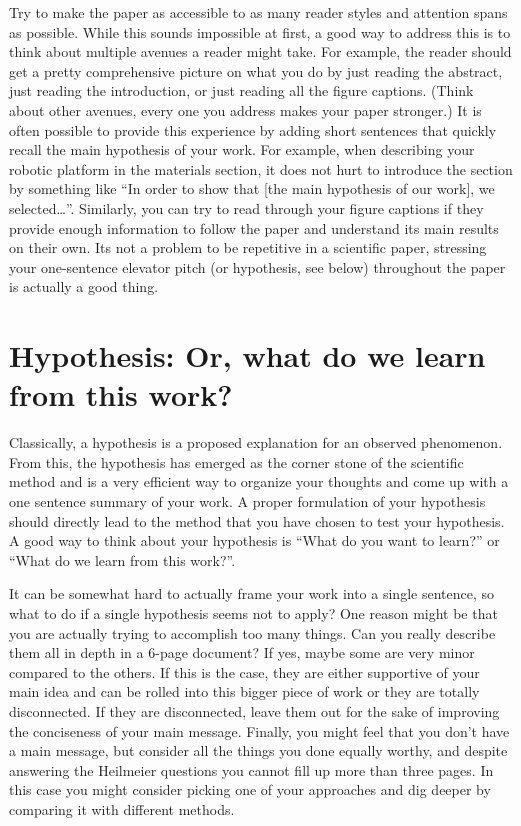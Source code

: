 \documentclass[paper=6.14in:9.21in,pagesize=pdftex,11pt,twoside,openright]{scrbook}
\begin{document}
Try to make the paper as accessible to as many reader styles and attention spans as possible. While this sounds impossible at first, a good way to address this is to think about multiple avenues a reader might take. For example, the reader should get a pretty comprehensive picture on what you do by just reading the abstract, just reading the introduction, or just reading all the figure captions. (Think about other avenues, every one you address makes your paper stronger.) It is often possible to provide this experience by adding short sentences  that quickly recall the main hypothesis of your work. For example, when describing your robotic platform in the materials section, it does not hurt to introduce the section by something like ``In order to show that [the main hypothesis of our work], we selected\ldots''. Similarly, you can try to read through your figure captions if they provide enough information to follow the paper and understand its main results on their own. Its not a problem to be repetitive in a scientific paper, stressing your one-sentence elevator pitch (or hypothesis, see below) throughout the paper is actually a good thing.

\section{Hypothesis: Or, what do we learn from this work?}
Classically, a hypothesis is a proposed explanation for an observed phenomenon. From this, the hypothesis has emerged as the corner stone of the scientific method and is a very efficient way to organize your thoughts and come up with a one sentence summary of your work. A proper formulation of your hypothesis should directly lead to the method that you have chosen to test your hypothesis. A good way to think about your hypothesis is ``What do you want to learn?'' or ``What do we learn from this work?''.

It can be somewhat hard to actually frame your work into a single sentence, so what to do if a single hypothesis seems not to apply? One reason might be that you are actually trying to accomplish too many things. Can you really describe them all in depth in a 6-page document? If yes, maybe some are very minor compared to the others.  If this is the case, they are either supportive of your main idea and can be rolled into this bigger piece of work or they are totally disconnected. If they are disconnected, leave them out for the sake of improving the conciseness of your main message. Finally, you might feel that you don't have a main message, but consider all the things you done equally worthy, and despite answering the Heilmeier questions you cannot fill up more than three pages. In this case you might consider picking one of your approaches and dig deeper by comparing it with different methods.
\end{document}
